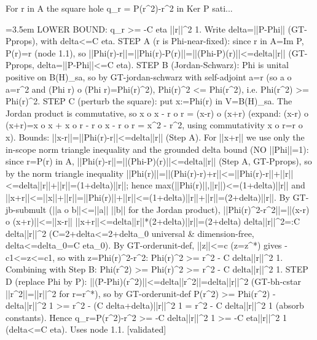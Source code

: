 \documentclass{article}
\newcommand{\step}[1]{\par\noindent\hangindent=3.5em\hangafter=1%
  \makebox[3.5em][l]{\textbf{#1.}}}
\newcommand{\steptag}[1]{\hfill{\small\textsf{[#1]}}}
\begin{document}
\begin{proofbox}{For r in A the square hole q\_r = P(r\textasciicircum{}2)-r\textasciicircum{}2 in Ker P sati...}
\step{1.2} LOWER BOUND: q\_r >= -C eta ||r||\textasciicircum{}2 1. Write delta=||P-Phi|| (GT-Pprops), with delta<=C eta. STEP A (r is Phi-near-fixed): since r in A=Im P, P(r)=r (node 1.1), so ||Phi(r)-r||=||Phi(r)-P(r)||=||(Phi-P)(r)||<=delta||r|| (GT-Pprops, delta=||P-Phi||<=C eta). STEP B (Jordan-Schwarz): Phi is unital positive on B(H)\_sa, so by GT-jordan-schwarz with self-adjoint a=r (so a o a=r\textasciicircum{}2 and (Phi r) o (Phi r)=Phi(r)\textasciicircum{}2), Phi(r)\textasciicircum{}2 <= Phi(r\textasciicircum{}2), i.e. Phi(r\textasciicircum{}2) >= Phi(r)\textasciicircum{}2. STEP C (perturb the square): put x:=Phi(r) in V=B(H)\_sa. The Jordan product is commutative, so x o x - r o r = (x-r) o (x+r) (expand: (x-r) o (x+r)=x o x + x o r - r o x - r o r = x\textasciicircum{}2 - r\textasciicircum{}2, using commutativity x o r=r o x). Bounds: ||x-r||=||Phi(r)-r||<=delta||r|| (Step A). For ||x+r|| we use only the in-scope norm triangle inequality and the grounded delta bound (NO ||Phi||=1): since r=P(r) in A, ||Phi(r)-r||=||(Phi-P)(r)||<=delta||r|| (Step A, GT-Pprops), so by the norm triangle inequality ||Phi(r)||=||(Phi(r)-r)+r||<=||Phi(r)-r||+||r||<=delta||r||+||r||=(1+delta)||r||; hence max(||Phi(r)||,||r||)<=(1+delta)||r|| and ||x+r||<=||x||+||r||=||Phi(r)||+||r||<=(1+delta)||r||+||r||=(2+delta)||r||. By GT-jb-submult (||a o b||<=||a|| ||b|| for the Jordan product), ||Phi(r)\textasciicircum{}2-r\textasciicircum{}2||=||(x-r) o (x+r)||<=||x-r|| ||x+r||<=delta||r||*(2+delta)||r||=(2+delta) delta||r||\textasciicircum{}2=:C delta||r||\textasciicircum{}2 (C=2+delta<=2+delta\_0 universal \& dimension-free, delta<=delta\_0=C eta\_0). By GT-orderunit-def, ||z||<=c (z=z\textasciicircum{}*) gives -c1<=z<=c1, so with z=Phi(r)\textasciicircum{}2-r\textasciicircum{}2: Phi(r)\textasciicircum{}2 >= r\textasciicircum{}2 - C delta||r||\textasciicircum{}2 1. Combining with Step B: Phi(r\textasciicircum{}2) >= Phi(r)\textasciicircum{}2 >= r\textasciicircum{}2 - C delta||r||\textasciicircum{}2 1. STEP D (replace Phi by P): ||(P-Phi)(r\textasciicircum{}2)||<=delta||r\textasciicircum{}2||=delta||r||\textasciicircum{}2 (GT-bh-cstar ||r\textasciicircum{}2||=||r||\textasciicircum{}2 for r=r\textasciicircum{}*), so by GT-orderunit-def P(r\textasciicircum{}2) >= Phi(r\textasciicircum{}2) - delta||r||\textasciicircum{}2 1 >= r\textasciicircum{}2 - (C delta+delta)||r||\textasciicircum{}2 1 = r\textasciicircum{}2 - C delta||r||\textasciicircum{}2 1 (absorb constants). Hence q\_r=P(r\textasciicircum{}2)-r\textasciicircum{}2 >= -C delta||r||\textasciicircum{}2 1 >= -C eta||r||\textasciicircum{}2 1 (delta<=C eta). Uses node 1.1. \steptag{validated} \\[4pt]

\end{proofbox}
\end{document}
